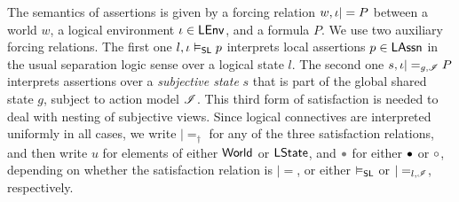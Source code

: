 The semantics of \colosl assertions is given by a forcing relation
$w,\iota|= P$ between a world $w$, a logical environment
$\iota\in\mathsf{LEnv}$, and a formula $P$. We use two auxiliary forcing
relations. The first one $l,\iota\mathrel{\vDash_{\mathsf{SL}}} p$ interprets local assertions
$p\in\mathsf{LAssn}$ in the usual separation logic sense over a logical
state $l$. The second one $s,\iota|=_{g,\mathscr{I}} P$ interprets
assertions over a \emph{subjective state} $s$ that is part of the
global shared state $g$, subject to action model $\mathscr{I}$. This third
form of satisfaction is needed to deal with nesting of subjective
views.
Since logical connectives are interpreted uniformly in all cases, we
write $|=_\dagger$ for any of the three satisfaction relations, and
then write $u$ for elements of either $\mathsf{World}$ or $\mathsf{LState}$, and
$\grey$ for either $\bullet$ or $\circ$, depending on whether
the satisfaction relation is $|=$, or either $\mathrel{\vDash_{\mathsf{SL}}}$ or
$|=_{l,\mathscr{I}}$, respectively.

